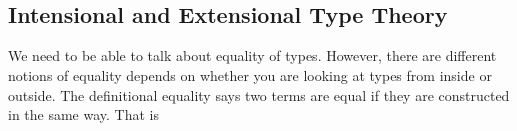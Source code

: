 \begin{code}
\AgdaSpace{}%
\AgdaSymbol{(}\AgdaSpace{}%
\AgdaSpace{}%
\AgdaSpace{}%
\AgdaSpace{}%
\AgdaSymbol{)}\<%
\\
%
\\[\AgdaEmptyExtraSkip]%
\>[0]\<%
\\
\>[0]\AgdaSpace{}%
\AgdaSymbol{:}\AgdaSpace{}%
\AgdaSpace{}%
\AgdaSymbol{\{}\AgdaSpace{}%
\AgdaSpace{}%
\AgdaSymbol{\}}\AgdaSpace{}%
\AgdaSpace{}%
\AgdaSpace{}%
\AgdaSpace{}%
\AgdaSpace{}%
\AgdaSpace{}%
\AgdaSpace{}%
\AgdaSpace{}%
\<%
\\
\>[0]\AgdaSpace{}%
\AgdaSymbol{=}\AgdaSpace{}%
\<%
\\
%
\\[\AgdaEmptyExtraSkip]%
\>[0]\AgdaSpace{}%
\AgdaSymbol{:}\AgdaSpace{}%
\AgdaSpace{}%
\AgdaSymbol{\{}\AgdaSpace{}%
\AgdaSpace{}%
\AgdaSpace{}%
\AgdaSymbol{\}}\AgdaSpace{}%
\AgdaSpace{}%
\AgdaSpace{}%
\AgdaSpace{}%
\AgdaSpace{}%
\AgdaSpace{}%
\AgdaSymbol{(}\AgdaSpace{}%
\AgdaSymbol{)}\AgdaSpace{}%
\AgdaSpace{}%
\AgdaSpace{}%
\AgdaSpace{}%
\AgdaSymbol{(}\AgdaSpace{}%
\AgdaSpace{}%
\AgdaSpace{}%
\AgdaSpace{}%
\AgdaSymbol{)}\<%
\\
\>[0]\AgdaSpace{}%
\AgdaSymbol{=}\AgdaSpace{}%
\<%
\end{code}

\subsection{Intensional and Extensional Type Theory}

We need to be able to talk about equality of types. However, there are different notions of equality depends on whether you are looking at types from inside or outside. The definitional equality says two terms are equal if they are constructed in the same way. That is 

